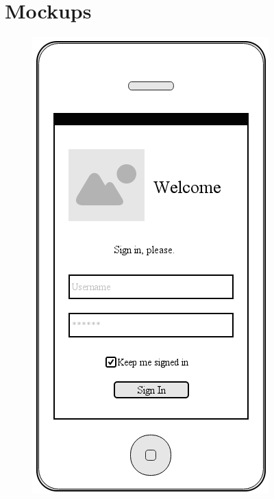 \documentclass[12pt]{article}
\begin{document}
\section{Mockups}
\begin{figure}[ht]
	\centering
	\includegraphics[width=\linewidth, height=0.4\textheight, keepaspectratio=true]{mockups/SignIn.png}

\end{figure}
\end{document}
